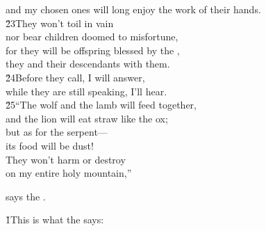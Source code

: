 \begin{poetry}
\poemll    and my chosen ones will long enjoy the work of their hands. \\
\poeml \v{23}They won't toil in vain \\
\poemll    nor bear children doomed to misfortune, \\
\poeml for they will be offspring blessed by the , \\
\poemll    they and their descendants with them. \\
\poeml \v{24}Before they call, I will answer, \\
\poemll    while they are still speaking, I'll hear. \\
\poeml \v{25}``The wolf and the lamb will feed together, \\
\poemll    and the lion will eat straw like the ox; \\
\poeml but as for the serpent--- \\
\poemll    its food will be dust! \\
\poeml They won't harm or destroy \\
\poemll    on my entire holy mountain,''
\end{poetry}

says the .

\v{1}This is what the  says:

